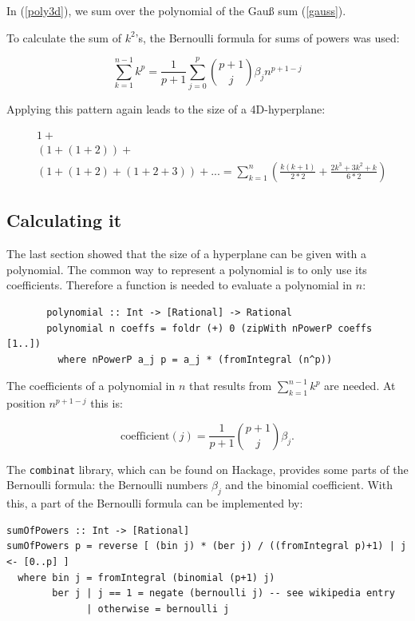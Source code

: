 \documentclass{tmr}
\begin{document}
In (\ref{poly3d}), we sum over the polynomial of the Gauß sum (\ref{gauss}).

To calculate the sum of $k^2$'s, the Bernoulli formula for sums of powers was used:

\begin{equation} \label{bernoulli}
\boxed{
\sum_{k=1}^{n-1} k^p = \frac{1}{p+1} \sum_{j=0}^{p} \binom{p+1}{j} \beta_{j} n^{p+1-j}
}
\end{equation}

Applying this pattern again leads to the size of a 4D-hyperplane:

\begin{equation}\label{poly4d}
\begin{split}
 & 1 +\\
 &(1+(1+2) )+ \\
 &(1+(1+2)+(1+2+3)) + ... = \sum_{k=1}^{n} (\frac{ k (k+1) }{2*2}  + \frac{2k^3+3k^2+k}{6*2})
\end{split}
\end{equation}

\subsection {Calculating it}

The last section showed that the size of a hyperplane can be given with a polynomial. The common way to represent a polynomial is to only use its coefficients. Therefore a function is needed to evaluate a polynomial in $n$:
\small
\begin{Verbatim}
       polynomial :: Int -> [Rational] -> Rational
       polynomial n coeffs = foldr (+) 0 (zipWith nPowerP coeffs [1..])
         where nPowerP a_j p = a_j * (fromIntegral (n^p))
\end{Verbatim}

The coefficients of a polynomial in $n$ that results from $\sum_{k=1}^{n-1} k^p$ are needed. At position $n^{p+1-j}$ this is:

\begin{equation} \label{bernoulli}
\mbox{coefficient}(j) = \frac{1}{p+1} \binom{p+1}{j} \beta_{j}.
\end{equation}

The \verb|combinat| library, which can be found on Hackage, provides some parts of the Bernoulli formula: the Bernoulli numbers $\beta_{j}$ and the binomial coefficient. With this, a part of the Bernoulli formula can be implemented by:

\small
\begin{Verbatim}
sumOfPowers :: Int -> [Rational]
sumOfPowers p = reverse [ (bin j) * (ber j) / ((fromIntegral p)+1) | j <- [0..p] ]
  where bin j = fromIntegral (binomial (p+1) j)
        ber j | j == 1 = negate (bernoulli j) -- see wikipedia entry
              | otherwise = bernoulli j
\end{Verbatim}
\end{document}

